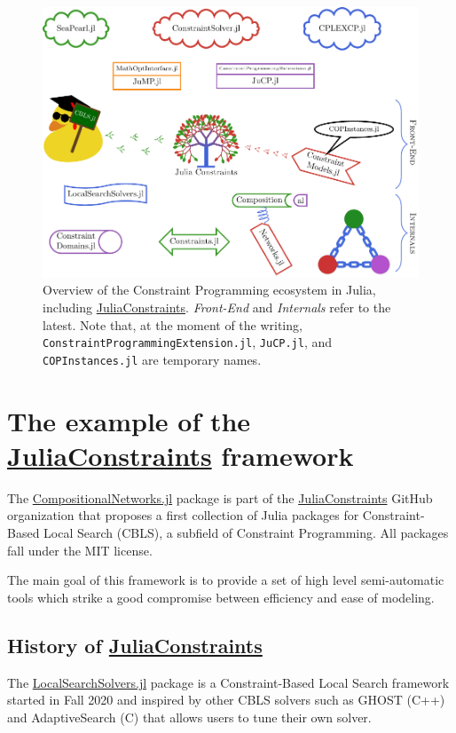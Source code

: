\documentclass{juliacon}
\newcommand{\jc}{\href{https://github.com/JuliaConstraints}{JuliaConstraints}\xspace}
\newcommand{\cnjl}{\href{https://github.com/JuliaConstraints/CompositionalNetworks.jl}{CompositionalNetworks.jl}\xspace}
\newcommand{\lssjl}{\href{https://github.com/JuliaConstraints/LocalSearchSolvers.jl}{LocalSearchSolvers.jl}\xspace}
\begin{document}
\begin{figure}[t]
  \centerline{\includegraphics[page=1, width=.9\textwidth]{figs/overview.pdf}}
  \caption{Overview of the Constraint Programming ecosystem in Julia, including \jc. \emph{Front-End} and \emph{Internals} refer to the latest. Note that, at the moment of the writing, \texttt{ConstraintProgrammingExtension.jl}, \texttt{JuCP.jl}, and \texttt{COPInstances.jl} are temporary names.}
  \label{fig:overview}
\end{figure}

\FloatBarrier

\section{The example of the \jc framework}
\label{sec:juliaconstraints}

The \cnjl package is part of the \jc GitHub organization that proposes a first collection of Julia packages for Constraint-Based Local Search (CBLS), a subfield of Constraint Programming. All packages fall under the MIT license.

The main goal of this framework is to provide a set of high level semi-automatic tools which strike a good compromise between efficiency and ease of modeling.

\subsection{History of \jc}
\label{subsec:history}

The \lssjl package is a Constraint-Based Local Search framework started in Fall 2020 and inspired by other CBLS solvers such as GHOST (C++) and AdaptiveSearch (C) that allows users to tune their own solver.
\end{document}
